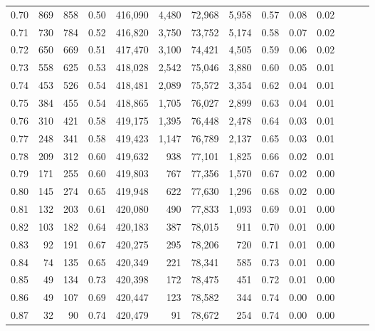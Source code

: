 \begin{tabular}{rrrrrrrrrrrrrr}
0.70 &     869 &    858 &  0.50 &  416,090 &    4,480 &  72,968 &   5,958 &  0.57 &  0.08 &      0.02 \\
0.71 &     730 &    784 &  0.52 &  416,820 &    3,750 &  73,752 &   5,174 &  0.58 &  0.07 &      0.02 \\
0.72 &     650 &    669 &  0.51 &  417,470 &    3,100 &  74,421 &   4,505 &  0.59 &  0.06 &      0.02 \\
0.73 &     558 &    625 &  0.53 &  418,028 &    2,542 &  75,046 &   3,880 &  0.60 &  0.05 &      0.01 \\
0.74 &     453 &    526 &  0.54 &  418,481 &    2,089 &  75,572 &   3,354 &  0.62 &  0.04 &      0.01 \\
0.75 &     384 &    455 &  0.54 &  418,865 &    1,705 &  76,027 &   2,899 &  0.63 &  0.04 &      0.01 \\
0.76 &     310 &    421 &  0.58 &  419,175 &    1,395 &  76,448 &   2,478 &  0.64 &  0.03 &      0.01 \\
0.77 &     248 &    341 &  0.58 &  419,423 &    1,147 &  76,789 &   2,137 &  0.65 &  0.03 &      0.01 \\
0.78 &     209 &    312 &  0.60 &  419,632 &      938 &  77,101 &   1,825 &  0.66 &  0.02 &      0.01 \\
0.79 &     171 &    255 &  0.60 &  419,803 &      767 &  77,356 &   1,570 &  0.67 &  0.02 &      0.00 \\
0.80 &     145 &    274 &  0.65 &  419,948 &      622 &  77,630 &   1,296 &  0.68 &  0.02 &      0.00 \\
0.81 &     132 &    203 &  0.61 &  420,080 &      490 &  77,833 &   1,093 &  0.69 &  0.01 &      0.00 \\
0.82 &     103 &    182 &  0.64 &  420,183 &      387 &  78,015 &     911 &  0.70 &  0.01 &      0.00 \\
0.83 &      92 &    191 &  0.67 &  420,275 &      295 &  78,206 &     720 &  0.71 &  0.01 &      0.00 \\
0.84 &      74 &    135 &  0.65 &  420,349 &      221 &  78,341 &     585 &  0.73 &  0.01 &      0.00 \\
0.85 &      49 &    134 &  0.73 &  420,398 &      172 &  78,475 &     451 &  0.72 &  0.01 &      0.00 \\
0.86 &      49 &    107 &  0.69 &  420,447 &      123 &  78,582 &     344 &  0.74 &  0.00 &      0.00 \\
0.87 &      32 &     90 &  0.74 &  420,479 &       91 &  78,672 &     254 &  0.74 &  0.00 &      0.00 \\

\end{tabular}
